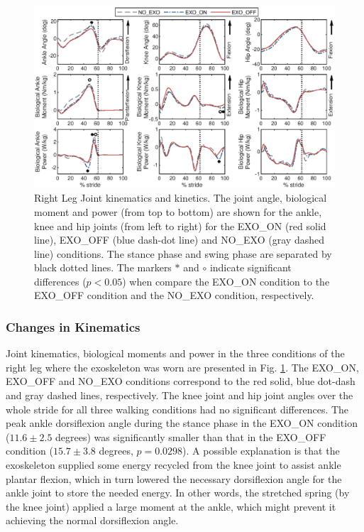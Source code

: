 \documentclass[twocolumn,cleanfoot,10pt]{asme2ej}
\begin{document}
\begin{figure}[th]
	\centering
	\includegraphics[width=17cm]{compare.eps}
	\caption{Right Leg Joint kinematics and kinetics.
	The joint angle, biological moment and power (from top to bottom) are shown for the ankle, knee and hip joints (from left to right) for the EXO\_ON (red solid line), EXO\_OFF (blue dash-dot line) and NO\_EXO (gray dashed line) conditions.
	The stance phase and swing phase are separated by black dotted lines.
	The markers $*$ and $\circ$ indicate significant differences ($p<0.05$) when compare the EXO\_ON condition to the EXO\_OFF condition and the NO\_EXO condition, respectively.}
	\label{fig:kinetics_r}
\end{figure}

\subsubsection{Changes in Kinematics}
Joint kinematics, biological moments and power in the three conditions of the right leg where the exoskeleton was worn are presented in Fig. \ref{fig:kinetics_r}.
The EXO\_ON, EXO\_OFF and NO\_EXO conditions correspond to the red solid, blue dot-dash and gray dashed lines, respectively.
The knee joint and hip joint angles over the whole stride for all three walking conditions had no significant differences.
The peak ankle dorsiflexion angle during the stance phase in the EXO\_ON condition ($11.6\pm2.5$ degrees) was significantly smaller than that in the EXO\_OFF condition ($15.7\pm3.8$ degrees, $p=0.0298$).
A possible explanation is that the exoskeleton supplied some energy recycled from the knee joint to assist ankle plantar flexion, which in turn lowered the necessary dorsiflexion angle for the ankle joint to store the needed energy.
In other words, the stretched spring (by the knee joint) applied a large moment at the ankle, which might prevent it achieving the normal dorsiflexion angle.
\end{document}
